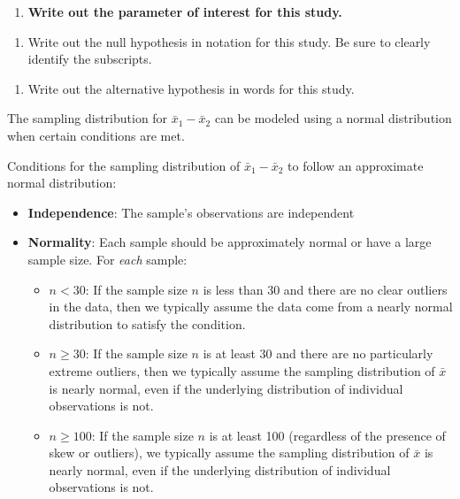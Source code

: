 \documentclass[
]{report}
\providecommand{\tightlist}{%
  \setlength{\itemsep}{0pt}\setlength{\parskip}{0pt}}
\begin{document}
\begin{enumerate}
\def\labelenumi{\arabic{enumi}.}
\tightlist
\item
  \textbf{Write out the parameter of interest for this study.}
\end{enumerate}

\vspace{0.8in}

\begin{enumerate}
\def\labelenumi{\arabic{enumi}.}
\setcounter{enumi}{1}
\tightlist
\item
  Write out the null hypothesis in notation for this study. Be sure to clearly identify the subscripts.
\end{enumerate}

\vspace{0.5in}

\begin{enumerate}
\def\labelenumi{\arabic{enumi}.}
\setcounter{enumi}{2}
\tightlist
\item
  Write out the alternative hypothesis in words for this study.
\end{enumerate}

\vspace{0.8in}

The sampling distribution for \(\bar{x}_1-\bar{x}_2\) can be modeled using a normal distribution when certain conditions are met.

Conditions for the sampling distribution of \(\bar{x}_1-\bar{x}_2\) to follow an approximate normal distribution:

\begin{itemize}
\item
  \textbf{Independence}: The sample's observations are independent
\item
  \textbf{Normality}: Each sample should be approximately normal or have a large sample size. For \emph{each} sample:

  \begin{itemize}
  \item
    \(n < 30\): If the sample size \(n\) is less than 30 and there are no clear outliers in the data, then we typically assume the data come from a nearly normal distribution to satisfy the condition.
  \item
    \(n \ge 30\): If the sample size \(n\) is at least 30 and there are no particularly extreme outliers, then we typically assume the sampling distribution of \(\bar{x}\) is nearly normal, even if the underlying distribution of individual observations is not.
  \item
    \(n \geq 100\): If the sample size \(n\) is at least 100 (regardless of the presence of skew or outliers), we typically assume the sampling distribution of \(\bar{x}\) is nearly normal, even if the underlying distribution of individual observations is not.
  \end{itemize}
\end{itemize}
\end{document}
